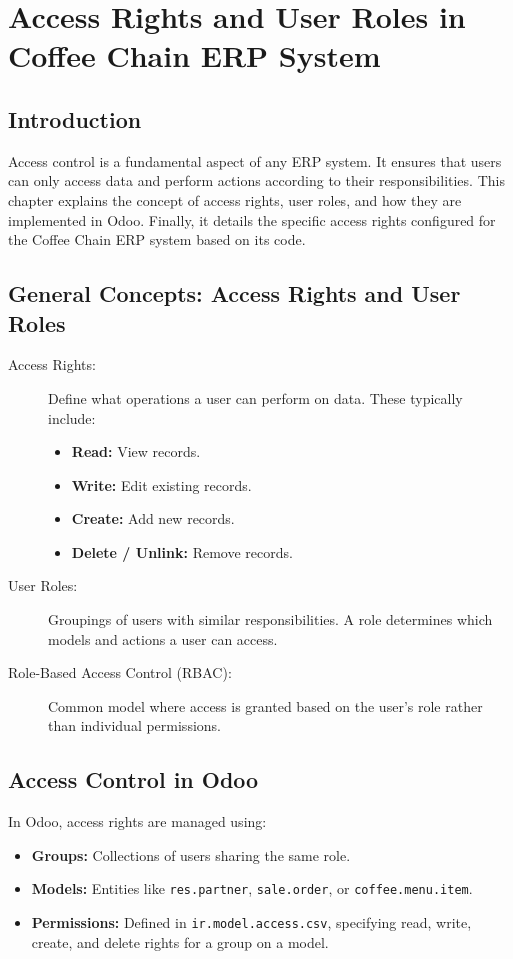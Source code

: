 \chapter{Access Rights and User Roles in Coffee Chain ERP System}

\section*{Introduction}
Access control is a fundamental aspect of any ERP system. It ensures that users can only access data and perform actions according to their responsibilities. This chapter explains the concept of access rights, user roles, and how they are implemented in Odoo. Finally, it details the specific access rights configured for the Coffee Chain ERP system based on its code.

\section*{General Concepts: Access Rights and User Roles}
\begin{description}
    \item[Access Rights:] Define what operations a user can perform on data. These typically include:
        \begin{itemize}
            \item \textbf{Read:} View records.
            \item \textbf{Write:} Edit existing records.
            \item \textbf{Create:} Add new records.
            \item \textbf{Delete / Unlink:} Remove records.
        \end{itemize}
    \item[User Roles:] Groupings of users with similar responsibilities. A role determines which models and actions a user can access.
    \item[Role-Based Access Control (RBAC):] Common model where access is granted based on the user’s role rather than individual permissions.
\end{description}


\section*{Access Control in Odoo}
In Odoo, access rights are managed using:
\begin{itemize}
    \item \textbf{Groups:} Collections of users sharing the same role.
    \item \textbf{Models:} Entities like \texttt{res.partner}, \texttt{sale.order}, or \texttt{coffee.menu.item}.
    \item \textbf{Permissions:} Defined in \texttt{ir.model.access.csv}, specifying read, write, create, and delete rights for a group on a model.
\end{itemize}

